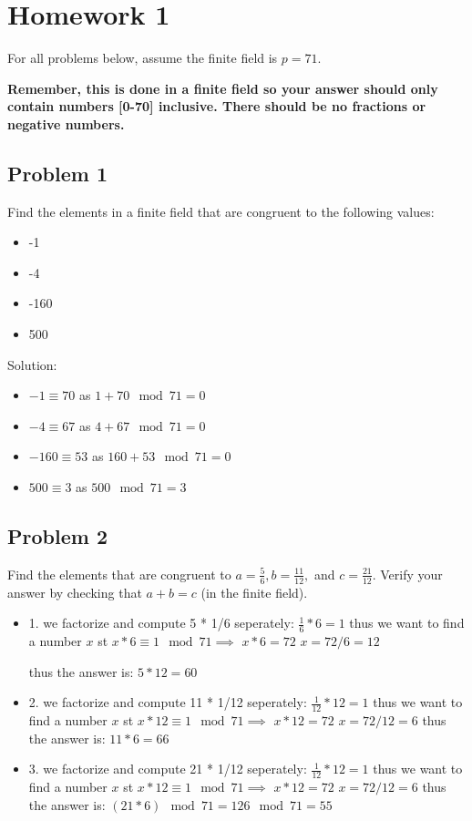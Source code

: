 \documentclass{article}
\begin{document}
\section*{Homework 1}

For all problems below, assume the finite field is \( p = 71 \).

\textbf{Remember, this is done in a finite field so your answer should only contain numbers [0-70] inclusive. There should be no fractions or negative numbers.}

\subsection*{Problem 1}
Find the elements in a finite field that are congruent to the following values:
\begin{itemize}
    \item -1 
    \item -4 
    \item -160
    \item 500
\end{itemize}

Solution: 

\begin{itemize}
    \item $-1 \equiv 70$ as $1 + 70 \mod 71 = 0$
    \item $-4 \equiv 67$ as $4 + 67 \mod 71 = 0$
    \item $-160 \equiv 53$ as $160 + 53 \mod 71 = 0$
    \item $500 \equiv 3$ as $500 \mod 71 = 3$
\end{itemize}

\subsection*{Problem 2}
Find the elements that are congruent to \( a = \frac{5}{6}, b = \frac{11}{12}, \) and \( c = \frac{21}{12} \).
Verify your answer by checking that \( a + b = c \) (in the finite field).

\begin{itemize}
    \item 1.
        we factorize and compute 5 * 1/6 seperately:
        $\frac{1}{6} * 6 = 1$ thus we want to find a number $x$ st
        $x*6 \equiv 1 \mod 71 \implies$ $x*6 = 72$  
        $x = 72/6 = 12$
        
        thus the answer is: $5 * 12 = 60$
    \item 2.
        we factorize and compute 11 * 1/12 seperately:
        $\frac{1}{12} * 12 = 1$ thus we want to find a number $x$ st
        $x*12 \equiv 1 \mod 71 \implies$ $x*12 = 72$
        $x = 72/12 = 6$
        thus the answer is: $11 * 6 = 66$
    \item 3.
        we factorize and compute 21 * 1/12 seperately:
        $\frac{1}{12} * 12 = 1$ thus we want to find a number $x$ st
        $x*12 \equiv 1 \mod 71 \implies$ $x*12 = 72$
        $x = 72/12 = 6$
        thus the answer is: $(21 * 6) \mod 71 = 126 \mod 71 = 55$
    \end{itemize}
\end{document}
